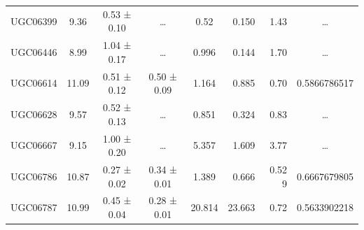 \documentclass[reprint,%
 amsmath,amssymb,
 aps,
]{revtex4-1}
\begin{document}
\begin{table}[]
\begin{tabular}{cccccrrc}
\rowcolor[HTML]{F3F3F3} 
UGC06399             & 9.36                      & 0.53 ± 0.10           & …                      & 0.52                                                         & 0.150                                                          & 1.43                                                           & …                                                             \\
\rowcolor[HTML]{F3F3F3} 
UGC06446             & 8.99                      & 1.04 ± 0.17           & …                      & 0.996                                                        & 0.144                                                          & 1.70                                                           & …                                                             \\
\rowcolor[HTML]{F3F3F3} 
UGC06614             & 11.09                     & 0.51 ± 0.12           & 0.50 ± 0.09            & 1.164                                                        & 0.885                                                          & 0.70                                                           & \multicolumn{1}{r}{\cellcolor[HTML]{F3F3F3}0.5866786517}      \\
\rowcolor[HTML]{F3F3F3} 
UGC06628             & 9.57                      & 0.52 ± 0.13           & …                      & 0.851                                                        & 0.324                                                          & 0.83                                                           & …                                                             \\
\rowcolor[HTML]{F3F3F3} 
UGC06667             & 9.15                      & 1.00 ± 0.20           & …                      & 5.357                                                        & 1.609                                                          & 3.77                                                           & …                                                             \\
\rowcolor[HTML]{F3F3F3} 
UGC06786             & 10.87                     & 0.27 ± 0.02           & 0.34 ± 0.01            & 1.389                                                        & 0.666                                                         & 0.52 9                                                          & \multicolumn{1}{r}{\cellcolor[HTML]{F3F3F3}0.6667679805}      \\
\rowcolor[HTML]{F3F3F3} 
UGC06787             & 10.99                     & 0.45 ± 0.04           & 0.28 ± 0.01            & 20.814                                                       & 23.663                                                         & 0.72                                                           & \multicolumn{1}{r}{\cellcolor[HTML]{F3F3F3}0.5633902218}      \\

\end{tabular}
\end{table}
\end{document}
